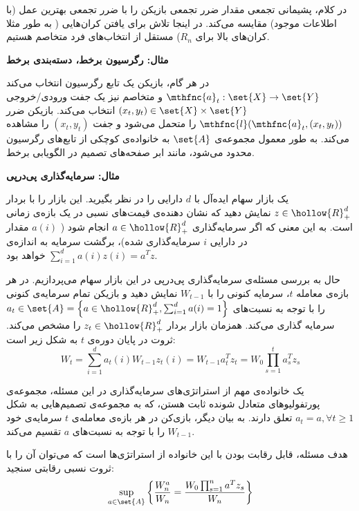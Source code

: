 در کلام، پشیمانی تجمعی مقدار ضرر تجمعی بازیکن را با ضرر تجمعی بهترین عمل (با اطلاعات موجود) مقایسه می‌کند. در اینجا تلاش برای یافتن کران‌هایی ( به طور مثلا کران‌های بالا برای 
$R_n$) 
مستقل از انتخاب‌های فرد متخاصم هستیم.

{\bf
مثال: رگرسیون برخط، دسته‌بندی
برخط
} 

در هر گام، بازیکن یک تابع رگرسیون انتخاب می‌کند 
$\mthfnc{a}_t : \set{X} \rightarrow \set{Y}$ 
و متخاصم نیز یک جفت ورودی/خروجی 
$(x_t, y_t) \in \set{X} \times \set{Y}$ 
انتخاب می‌کند. بازیکن ضرر 
$\mthfnc{l}( \mthfnc{a}_t, (x_t, y_t) )$ 
را متحمل می‌شود و جفت 
$(x_t, y_t)$ 
را مشاهده می‌کند. به طور معمول مجموعه‌ی 
$\set{A}$ 
به خانواده‌ی کوچکی از تابع‌های رگرسیون محدود می‌شود، مانند ابر صفحه‌های تصمیم
در الگویابی
برخط.



{\bf
مثال: سرمایه‌گذاری پی‌درپی
} 

یک بازار سهام ایده‌آل
با 
$d$ 
دارایی
را در نظر بگیرید. این بازار را با بردار 
$z \in \hollow{R}^d_+$ 
نمایش دهید که نشان دهنده‌ی قیمت‌های نسبی در یک بازه‌ی زمانی است. به این معنی که اگر سرمایه‌گذاری 
$a \in \hollow{R}^d_+$ 
انجام شود ( 
$a(i)$ 
مقدار در دارایی 
$i$ 
سرمایه‌گذاری شده)، برگشت سرمایه به اندازه‌ی 
$ \sum^{d}_{i=1} a(i) z(i) = a^T z$ 
خواهد بود.

حال به بررسی مسئله‌ی سرمایه‌گذاری پی‌درپی در این بازار سهام می‌پردازیم. در هر بازه‌ی معامله 
$t$، 
سرمایه
کنونی را با 
$W_{t-1}$ 
نمایش دهید و بازیکن تمام سرمایه‌ی کنونی را با توجه به نسبت‌های 
$a_t \in \set{A} = \left\lbrace a \in \hollow{R}^d_+ , \sum^{d}_{i=1} a(i) = 1 \right\rbrace$ 
سرمایه گذاری می‌کند. همزمان بازار بردار 
$z_t \in \hollow{R}^d_+$ 
را مشخص می‌کند. ثروت در پایان دوره‌ی 
$t$ 
به شکل زیر است:
\[
W_t = \sum^{d}_{i=1} a_t (i) W_{t-1} z_t (i) = W_{t-1} a^T_t z_t = W_0 \prod^{t}_{s=1} a^T_s z_s
\]

یک خانواده‌ی مهم از استراتژی‌های سرمایه‌گذاری در این مسئله، مجموعه‌ی پورتفولیوهای متعادل شونده ثابت
هستن، که به مجموعه‌ی تصمیم‌هایی به شکل 
$a_t = a, \forall t \geq 1$ 
تعلق دارند. به بیان دیگر، بازی‌کن در هر بازه‌ی معامله‌ی 
$t$ 
سرمایه‌ی خود 
$W_{t-1}$ 
را با توجه به نسبت‌های 
$a$ 
تقسیم می‌کند.

هدف مسئله، قابل رقابت بودن با این خانواده از استراتژی‌ها است که می‌توان آن را با ثروت نسبی رقابتی
سنجید:
\[
\sup_{a \in \set{A}} \left\lbrace \frac{ W^a_n }{ W_n } = \frac{ W_0 \prod^{n}_{s=1} a^T z_s }{ W_n } \right\rbrace
\]

